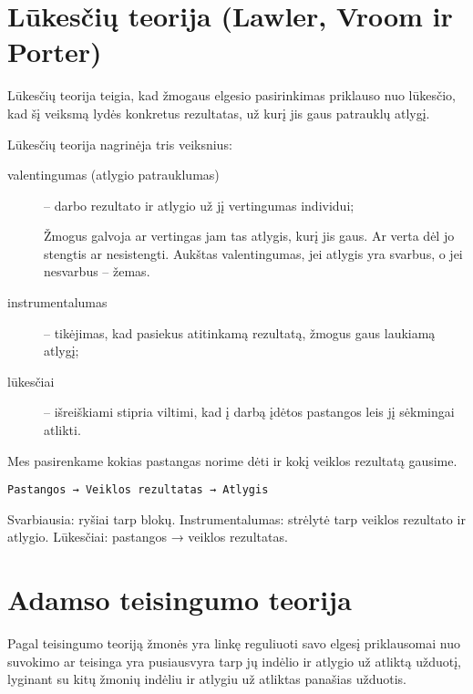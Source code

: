 \section{Lūkesčių teorija (Lawler, Vroom ir Porter)}

Lūkesčių teorija teigia, kad žmogaus elgesio pasirinkimas priklauso nuo
lūkesčio, kad šį veiksmą lydės konkretus rezultatas, už kurį jis
gaus patrauklų atlygį.

Lūkesčių teorija nagrinėja tris veiksnius:
\begin{description}
  \item[valentingumas (atlygio patrauklumas)] – darbo rezultato ir
    atlygio už jį vertingumas individui;
    \begin{note}
      Žmogus galvoja ar vertingas jam tas atlygis, kurį jis gaus. Ar
      verta dėl jo stengtis ar nesistengti. Aukštas valentingumas,
      jei atlygis yra svarbus, o jei nesvarbus – žemas.
    \end{note}
  \item[instrumentalumas] – tikėjimas, kad pasiekus atitinkamą rezultatą,
    žmogus gaus laukiamą atlygį;
  \item[lūkesčiai] – išreiškiami stipria viltimi, kad į darbą įdėtos
    pastangos leis jį sėkmingai atlikti.
\end{description}

Mes pasirenkame kokias pastangas norime dėti ir kokį veiklos rezultatą
gausime.

\begin{verbatim}
Pastangos → Veiklos rezultatas → Atlygis
\end{verbatim}

Svarbiausia: ryšiai tarp blokų. Instrumentalumas: strėlytė tarp veiklos
rezultato ir atlygio. Lūkesčiai: pastangos → veiklos rezultatas.

\section{Adamso teisingumo teorija}

Pagal teisingumo teoriją žmonės yra linkę reguliuoti savo elgesį
priklausomai nuo suvokimo ar teisinga yra pusiausvyra tarp jų indėlio
ir atlygio už atliktą užduotį, lyginant su kitų žmonių indėliu ir
atlygiu už atliktas panašias užduotis.

